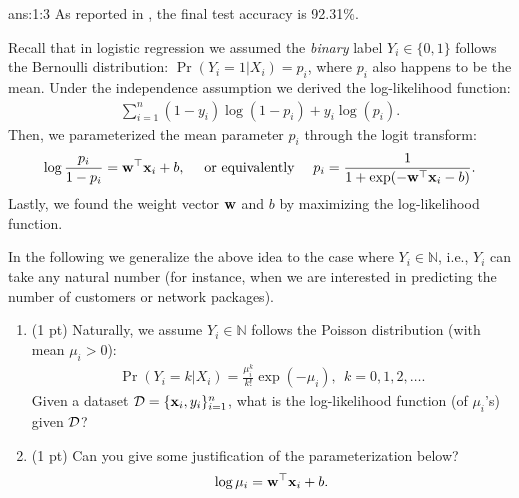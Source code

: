 \documentclass{tron}
\newcommand{\mref}[1]{\underline{\textbf{\hypersetup{linkcolor=orange}\Cref{#1}\hypersetup{linkcolor=blue}}}}
\begin{document}
\begin{answer}{ans:1:3}
	As reported in \mref{ans:1:2}, the final test accuracy is 92.31\%.
\end{answer}



\newpage
\setcounter{section}{2}
\begin{exercise}{}
Recall that in logistic regression we assumed the \emph{binary} label $Y_i \in \{0,1\}$ follows the Bernoulli distribution: $\Pr(Y_i = 1 | X_i) = p_i$, where $p_i$ also happens to be the mean. Under the independence assumption we derived the log-likelihood function:
\begin{align}
\sum_{i=1}^n (1-y_i) \log(1-p_i) + y_i \log(p_i).
\end{align}
Then, we parameterized the mean parameter $p_i$ through the logit transform:
\begin{align}
\log\frac{p_i}{1-p_i} = \mathbf{w}^\top \mathbf{x}_i + b, \quad \mbox{ or equivalently } \quad p_i = \frac{1}{1+\exp(-\mathbf{w}^\top \mathbf{x}_i - b)}.
\end{align}
Lastly, we found the weight vector $\mathbf{w}$ and $b$ by maximizing the log-likelihood function. 

In the following we generalize the above idea to the case where $Y_i \in \mathds{N}$, i.e., $Y_i$ can take any natural number (for instance, when we are interested in predicting the number of customers or network packages).

\begin{enumerate}
\item (1 pt) Naturally, we assume $Y_i \in \mathds{N}$ follows the Poisson distribution (with mean $\mu_i > 0$):
	\begin{align}
	\Pr(Y_i = k | X_i) = \frac{\mu_i^k}{k!} \exp(-\mu_i), ~~ k = 0, 1, 2, \ldots. \label{eqn:poisson-pdf}
	\end{align}
	Given a dataset $\mathcal{D} = \{\mathbf{x}_i, y_i\}_{i=1}^n$, what is the log-likelihood function (of $\mu_i$'s) given $\mathcal{D}$?

\ans{\mref{ans:2:1}} 
	
\item (1 pt) Can you give some justification of the parameterization below?
	\begin{align}
	\log\mu_i = \mathbf{w}^\top \mathbf{x}_i + b. \label{eqn:log-param}
	\end{align}

\ans{\mref{ans:2:2}} 
	

\end{enumerate}
\end{exercise}
\end{document}
